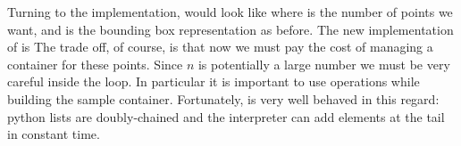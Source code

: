 Turning to the implementation,  would look like
%
%
%
where  is the number of points we want, and  is the bounding box
representation as before. The new implementation of  is
%
%
%
%
%
%
The trade off, of course, is that now we must pay the cost of managing a container for these
points.  Since $n$ is potentially a large number we must be very careful inside the
 loop. In particular it is important to use  operations while building
the sample container. Fortunately,  is very well behaved in this regard: python
lists are doubly-chained and the interpreter can add elements at the tail in constant time. 

